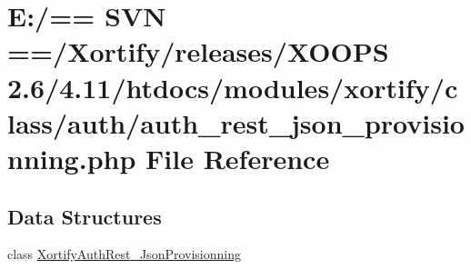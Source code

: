 \hypertarget{auth__rest__json__provisionning_8php}{\section{E\-:/== S\-V\-N ==/\-Xortify/releases/\-X\-O\-O\-P\-S 2.6/4.11/htdocs/modules/xortify/class/auth/auth\-\_\-rest\-\_\-json\-\_\-provisionning.php File Reference}
\label{auth__rest__json__provisionning_8php}
}
\subsection*{Data Structures}
\begin{DoxyCompactItemize}
\item 
class \hyperlink{class_xortify_auth_rest___json_provisionning}{Xortify\-Auth\-Rest\-\_\-\-Json\-Provisionning}
\end{DoxyCompactItemize}
